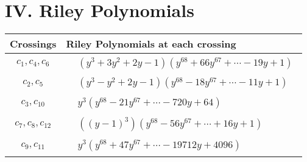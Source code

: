 \documentclass[1p]{elsarticle_modified}
\theoremstyle{definition}
\begin{document}
\centering \section*{ IV. Riley Polynomials}
\begin{tabular}{m{50pt}|m{274pt}}
Crossings & \hspace{64pt}Riley Polynomials at each crossing \\
\hline $$\begin{aligned}c_{1},c_{4},c_{6}\end{aligned}$$&$\begin{aligned}
&(y^3+3 y^2+2 y-1)(y^{68}+66 y^{67}+\cdots-19 y+1)
\end{aligned}$\\
\hline $$\begin{aligned}c_{2},c_{5}\end{aligned}$$&$\begin{aligned}
&(y^3- y^2+2 y-1)(y^{68}-18 y^{67}+\cdots-11 y+1)
\end{aligned}$\\
\hline $$\begin{aligned}c_{3},c_{10}\end{aligned}$$&$\begin{aligned}
&y^3(y^{68}-21 y^{67}+\cdots-720 y+64)
\end{aligned}$\\
\hline $$\begin{aligned}c_{7},c_{8},c_{12}\end{aligned}$$&$\begin{aligned}
&((y-1)^3)(y^{68}-56 y^{67}+\cdots+16 y+1)
\end{aligned}$\\
\hline $$\begin{aligned}c_{9},c_{11}\end{aligned}$$&$\begin{aligned}
&y^3(y^{68}+47 y^{67}+\cdots-19712 y+4096)
\end{aligned}$\\
\hline
\end{tabular}
\vskip 2pc
\end{document}

